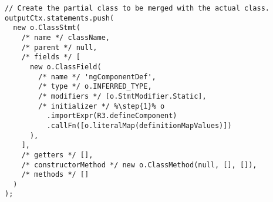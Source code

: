 \begin{verbatim}
// Create the partial class to be merged with the actual class.
outputCtx.statements.push(
  new o.ClassStmt(
    /* name */ className,
    /* parent */ null,
    /* fields */ [
      new o.ClassField(
        /* name */ 'ngComponentDef',
        /* type */ o.INFERRED_TYPE,
        /* modifiers */ [o.StmtModifier.Static],
        /* initializer */ %\step{1}% o
          .importExpr(R3.defineComponent)
          .callFn([o.literalMap(definitionMapValues)])
      ),
    ],
    /* getters */ [],
    /* constructorMethod */ new o.ClassMethod(null, [], []),
    /* methods */ []
  )
);
\end{verbatim}

